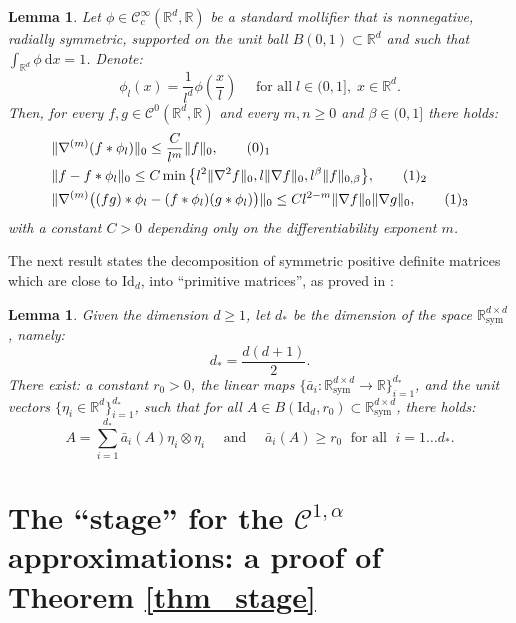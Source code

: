 \documentclass[reqno,twoside,11pt]{amsart}
\newcommand{\dx}{~\mathrm{d}x}
\newcommand{\sym}{\mathrm{sym}}
\newcommand{\Id}{\mathrm{Id}}
\newcommand{\R}{\mathbb{R}}
\numberwithin{equation}{section}
\theoremstyle{plain}
\newtheorem{lemma}[theorem]{Lemma}
\theoremstyle{definition}
\begin{document}
\begin{lemma}\label{lem_stima}
Let $\phi\in\mathcal{C}_c^\infty(\R^d,\mathbb{R})$ be a standard
mollifier that is nonnegative, radially symmetric, supported on the
unit ball $B(0,1)\subset\R^d$ and such that $\int_{\mathbb{R}^d} \phi \dx = 1$. Denote: 
$$\phi_l (x) = \frac{1}{l^d}\phi(\frac{x}{l})\quad\mbox{ for all
}\; l\in (0,1], \;  x\in\R^d.$$
Then, for every $f,g\in\mathcal{C}^0(\mathbb{R}^d,\R)$ and every
$m,n\geq 0$ and $\beta\in (0,1]$ there holds:
\begin{align*}
& \|\nabla^{(m)}(f\ast\phi_l)\|_{0} \leq
\frac{C}{l^m}\|f\|_0,\tag*{(\theequation)$_1$}\vspace{1mm} \refstepcounter{equation} \label{stima1}\\
& \|f - f\ast\phi_l\|_0\leq C \min\big\{l^2\|\nabla^{2}f\|_0,
l\|\nabla f\|_0, {l^\beta}\|f\|_{0,\beta}\big\},\tag*{(\theequation)$_2$} \vspace{1mm} \label{stima2}\\
& \|\nabla^{(m)}\big((fg)\ast\phi_l - (f\ast\phi_l)
(g\ast\phi_l)\big)\|_0\leq {C}{l^{2- m}}\|\nabla f\|_{0}
\|\nabla g\|_{0}, \tag*{(\theequation)$_3$} \label{stima4}
\end{align*}
with a constant $C>0$ depending only on the differentiability exponent $m$.
\end{lemma}

\medskip

\noindent The next result states the decomposition of symmetric positive definite matrices
which are close to $\Id_d$, into ``primitive matrices'', as proved in \cite[Lemma 5.2]{CDS}:

\begin{lemma}\label{lem_dec_def}
Given the dimension $d\geq 1$, let $d_*$ be the dimension of the space $\R^{d\times d}_\sym$, namely:
$$d_* = \frac{d(d+1)}{2}.$$
There exist: a constant $r_0>0$, the linear maps $\{\bar a_i:\R^{d\times
  d}_{\sym}\to\R\}_{i=1}^{d_*}$, and the unit vectors $\{\eta_i\in\R^{d}\}_{i=1}^{d_*}$, such that
for all $A\in B(\Id_d,r_0)\subset \R^{d\times d}_{\sym}$, there holds:
$$A = \sum_{i=1}^{d_*} \bar a_i(A) \eta_i\otimes\eta_i \quad \mbox{ and } \quad
\bar a_i (A)\geq r_0 \; \mbox{ for all }\;  i =1\ldots d_*.$$
\end{lemma}


\section{The ``stage'' for the $\mathcal{C}^{1,\alpha}$
  approximations: a proof of Theorem \ref{thm_stage}}\label{sec_stage}
\end{document}
